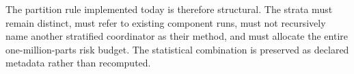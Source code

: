 The partition rule implemented today is therefore structural. The strata must
remain distinct, must refer to existing component runs, must not recursively
name another stratified coordinator as their method, and must allocate the
entire one-million-parts risk budget. The statistical combination is preserved
as declared metadata rather than recomputed.
